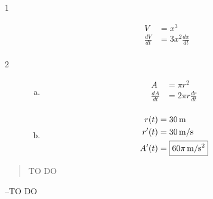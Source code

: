 \documentclass[letterpaper, landscape]{exam}
\begin{document}
  \begin{description}
    \item[1] 
      \begin{align*}
        V             & = x^3 \\
        \frac{dV}{dt} & = 3x^2 \frac{dx}{dt} \\
      \end{align*}

    \item[2]
      \begin{enumerate}[(a)]
        \item 
          \begin{align*}
            A             & = \pi r^2 \\
            \frac{dA}{dt} & = 2 \pi r \frac{dr}{dt} \\
          \end{align*}

        \item
          \begin{align*}
            r(t)  & = \unit[30]{m} \\
            r'(t) & = \unit[30]{m/s} \\
            A'(t) & = \boxed{ \unit[60 \pi]{m/s^2} } \\
          \end{align*}
      \end{enumerate}



  \end{description}

  \else
    \vspace{10 cm}
    \begin{quote}
      \begin{em}
        TO DO
      \end{em}
    \end{quote}
    \hspace{2 cm} --TO DO
  \fi
\end{document}
